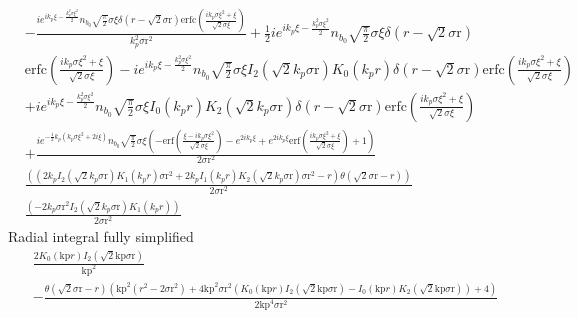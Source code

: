 \begin{equation}
\begin{split}
   &-\frac{i e^{i
   k_p\xi -\frac{k_p^2 \sigma \xi ^2}{2}}n_{b_0} \sqrt{\frac{\pi }{2}} \sigma \xi  \delta \left(r-\sqrt{2} \text{$\sigma $r}\right)
   \text{erfc}\left(\frac{i k_p\sigma \xi ^2+\xi }{\sqrt{2} \sigma \xi }\right)}{k_p^2 \text{$\sigma $r}^2}+\frac{1}{2} i e^{i
   k_p\xi -\frac{k_p^2 \sigma \xi ^2}{2}}n_{b_0} \sqrt{\frac{\pi }{2}} \sigma \xi  \delta \left(r-\sqrt{2} \text{$\sigma $r}\right)\\
   &\text{erfc}\left(\frac{i k_p\sigma \xi ^2+\xi }{\sqrt{2} \sigma \xi }\right)-i e^{i k_p\xi -\frac{k_p^2 \sigma \xi ^2}{2}}
  n_{b_0} \sqrt{\frac{\pi }{2}} \sigma \xi  I_2\left(\sqrt{2} k_p\text{$\sigma $r}\right) K_0(k_pr) \delta \left(r-\sqrt{2}
   \text{$\sigma $r}\right) \text{erfc}\left(\frac{i k_p\sigma \xi ^2+\xi }{\sqrt{2} \sigma \xi }\right)\\
   &+i e^{i k_p\xi
   -\frac{k_p^2 \sigma \xi ^2}{2}}n_{b_0} \sqrt{\frac{\pi }{2}} \sigma \xi  I_0(k_pr) K_2\left(\sqrt{2} k_p\text{$\sigma
   $r}\right) \delta \left(r-\sqrt{2} \text{$\sigma $r}\right) \text{erfc}\left(\frac{i k_p\sigma \xi ^2+\xi }{\sqrt{2} \sigma \xi
   }\right)\\
   &+\frac{i e^{-\frac{1}{2} k_p\left(k_p\sigma \xi ^2+2 i \xi \right)}n_{b_0} \sqrt{\frac{\pi }{2}} \sigma \xi 
   \left(-\text{erf}\left(\frac{\xi -i k_p\sigma \xi ^2}{\sqrt{2} \sigma \xi }\right)-e^{2 i k_p\xi }+e^{2 i k_p\xi }
   \text{erf}\left(\frac{i k_p\sigma \xi ^2+\xi }{\sqrt{2} \sigma \xi }\right)+1\right)}{2 \text{$\sigma $r}^2} \\
   &\frac{\left(\left(2 k_pI_2\left(\sqrt{2} k_p
   \text{$\sigma $r}\right) K_1(k_pr) \text{$\sigma $r}^2+2 k_pI_1(k_pr) K_2\left(\sqrt{2} k_p\text{$\sigma $r}\right)
   \text{$\sigma $r}^2-r\right) \theta \left(\sqrt{2} \text{$\sigma $r}-r\right)\right)}{2 \text{$\sigma $r}^2}\\
   &\frac{\left(-2 k_p\text{$\sigma $r}^2 I_2\left(\sqrt{2} k_p
   \text{$\sigma $r}\right) K_1(k_pr)\right)}{2 \text{$\sigma $r}^2}
   \end{split}
\end{equation}
Radial integral fully simplified
\begin{equation}
\begin{aligned}
&\frac{2 K_0(\text{kp} r) I_2\left(\sqrt{2} \text{kp} \text{$\sigma $r}\right)}{\text{kp}^2}\\
&-\frac{\theta \left(\sqrt{2} \text{$\sigma
   $r}-r\right) \left(\text{kp}^2 \left(r^2-2 \text{$\sigma $r}^2\right)+4 \text{kp}^2 \text{$\sigma $r}^2 \left(K_0(\text{kp} r)
   I_2\left(\sqrt{2} \text{kp} \text{$\sigma $r}\right)-I_0(\text{kp} r) K_2\left(\sqrt{2} \text{kp} \text{$\sigma $r}\right)\right)+4\right)}{2
   \text{kp}^4 \text{$\sigma $r}^2}
   \end{aligned}
\end{equation}

